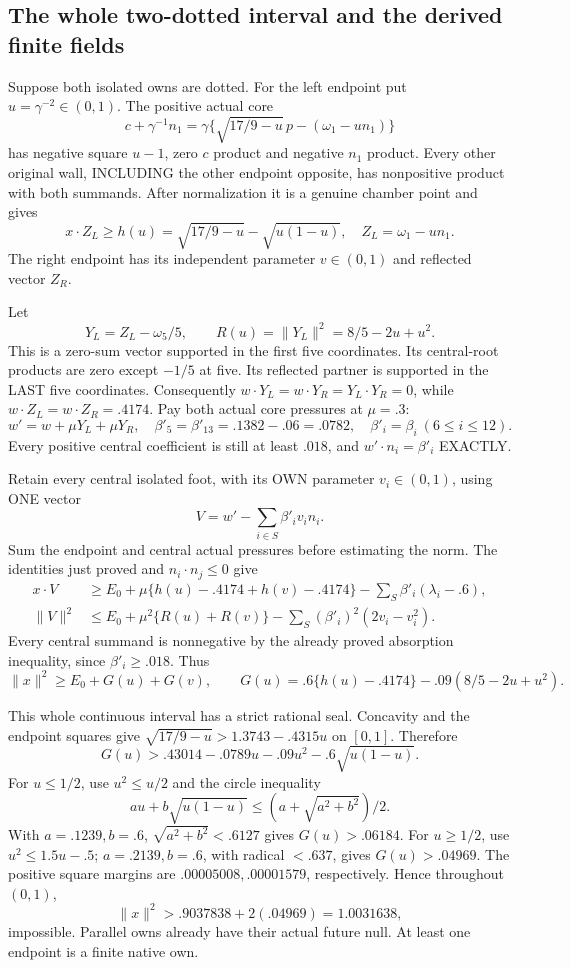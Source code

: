 \subsection{The whole two-dotted interval and the derived finite fields}
\label{app:arithA17anchors}

Suppose both isolated owns are dotted.
For the left endpoint put \(u=\gamma^{-2}\in(0,1)\).
The positive actual core
\[
 c+\gamma^{-1}n_1
   =\gamma\{\sqrt{17/9-u}\,p-(\omega_1-un_1)\}
\]
has negative square \(u-1\), zero \(c\) product and negative
\(n_1\) product.
Every other original wall, INCLUDING the other endpoint opposite,
has nonpositive product with both summands.
After normalization it is a genuine chamber point and gives
\[
 x\cdot Z_L\ge h(u)=\sqrt{17/9-u}-\sqrt{u(1-u)},\quad
 Z_L=\omega_1-un_1 .
\]
The right endpoint has its independent parameter \(v\in(0,1)\)
and reflected vector \(Z_R\).

Let
\[
 Y_L=Z_L-\omega_5/5,\qquad
 R(u)=\|Y_L\|^2=8/5-2u+u^2 .
\]
This is a zero-sum vector supported in the first five coordinates.
Its central-root products are zero except \(-1/5\) at five.
Its reflected partner is supported in the LAST five coordinates.
Consequently \(w\cdot Y_L=w\cdot Y_R=Y_L\cdot Y_R=0\), while
\(w\cdot Z_L=w\cdot Z_R=.4174\).
Pay both actual core pressures at \(\mu=.3\):
\[
 w'=w+\mu Y_L+\mu Y_R,\quad
 \beta'_5=\beta'_{13}=.1382-.06=.0782,\quad
 \beta'_i=\beta_i\ (6\le i\le12).
\]
Every positive central coefficient is still at least \(.018\),
and \(w'\cdot n_i=\beta'_i\) EXACTLY.

Retain every central isolated foot, with its OWN parameter
\(v_i\in(0,1)\), using ONE vector
\[
                       V=w'-\sum_{i\in S}\beta'_iv_in_i .
\]
Sum the endpoint and central actual pressures before estimating
the norm.  The identities just proved and
\(n_i\cdot n_j\le0\) give
\[
 \begin{split}
 x\cdot V&\ge E_0+
 \mu\{h(u)-.4174+h(v)-.4174\}
       -\sum_S\beta'_i(\lambda_i-.6),\\
 \|V\|^2&\le E_0+\mu^2\{R(u)+R(v)\}
       -\sum_S(\beta'_i)^2(2v_i-v_i^2).
 \end{split}
\]
Every central summand is nonnegative by the already proved
absorption inequality, since \(\beta'_i\ge.018\).
Thus
\[
 \|x\|^2\ge E_0+G(u)+G(v),\qquad
 G(u)=.6\{h(u)-.4174\}-.09(8/5-2u+u^2).
\]

This whole continuous interval has a strict rational seal.
Concavity and the endpoint squares give
\(\sqrt{17/9-u}>1.3743-.4315u\) on \([0,1]\).
Therefore
\[
 G(u)>.43014-.0789u-.09u^2-.6\sqrt{u(1-u)}.
\]
For \(u\le1/2\), use \(u^2\le u/2\) and the circle inequality
\[
 au+b\sqrt{u(1-u)}\le(a+\sqrt{a^2+b^2})/2 .
\]
With \(a=.1239,b=.6\), \(\sqrt{a^2+b^2}<.6127\)
gives \(G(u)>.06184\).
For \(u\ge1/2\), use \(u^2\le1.5u-.5\);
\(a=.2139,b=.6\), with radical \(<.637\), gives
\(G(u)>.04969\).
The positive square margins are \(.00005008,.00001579\),
respectively.
Hence throughout \((0,1)\),
\[
          \|x\|^2>.9037838+2(.04969)=1.0031638,
\]
impossible.  Parallel owns already have their actual future null.
At least one endpoint is a finite native own.

